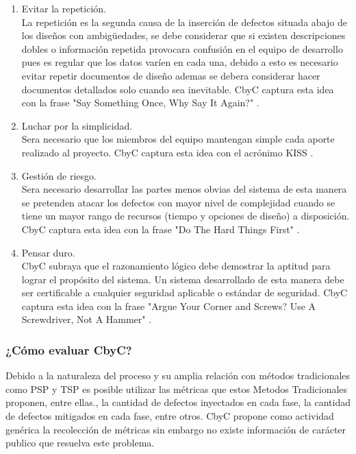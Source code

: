 \documentclass[runningheads,a4paper]{llncs}
\begin{document}
\begin{enumerate}
	\item Evitar la repetición.\\
	
	La repetición es la segunda causa de la inserción de defectos situada abajo de los diseños con ambigüedades, se debe considerar que si existen descripciones dobles o información repetida provocara confusión en el equipo de desarrollo pues es regular que los datos varíen en cada una, debido a esto es necesario evitar repetir documentos de diseño ademas se debera considerar hacer documentos detallados solo cuando sea inevitable. \gls{CbyC} captura esta idea con la frase "Say Something Once, Why Say It Again?" \cite{CbyCIntroduction}.\\ 

	\item Luchar por la simplicidad.\\
	
	Sera necesario que los miembros del equipo mantengan simple cada aporte realizado al proyecto. \gls{CbyC} captura esta idea con el acrónimo \gls{KISS} \cite{CbyCIntroduction}.\\ 
	
	\item Gestión de riesgo.\\
	
	Sera necesario desarrollar las partes menos obvias del sistema de esta manera se pretenden atacar los defectos con mayor nivel de complejidad cuando se tiene un mayor rango de recursos (tiempo y opciones de diseño) a disposición. \gls{CbyC} captura esta idea con la frase "Do The Hard Things First" \cite{CbyCIntroduction}.\\ 
	
	\item Pensar duro.\\
	
	\gls{CbyC} subraya que el razonamiento lógico debe demostrar la aptitud para lograr el propósito del sistema. Un sistema desarrollado de esta manera debe ser certificable a cualquier seguridad aplicable o estándar de seguridad. \gls{CbyC} captura esta idea con la frase "Argue Your Corner and Screws? Use A Screwdriver, Not A Hammer" \cite{CbyCIntroduction}.\\ 
	
\end{enumerate}


\subsubsection{¿Cómo evaluar \gls{CbyC}?}
Debido a la naturaleza del proceso y su amplia relación con métodos tradicionales como \gls{PSP} y \gls{TSP}  es posible utilizar las métricas que estos \gls{Metodos Tradicionales} proponen, entre ellas., la cantidad de defectos inyectados en cada fase, la cantidad de defectos mitigados en cada fase, entre otros. \gls{CbyC} propone como actividad genérica la recolección de métricas sin embargo no existe información de carácter publico que resuelva este problema.
\end{document}
